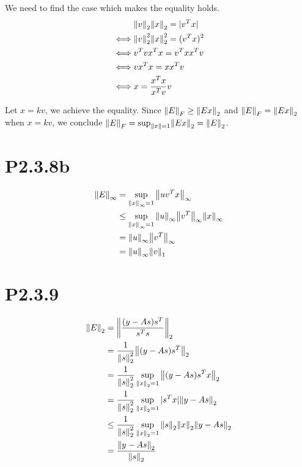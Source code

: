 \documentclass{article}
\begin{document}
We need to find the case which makes the equality holds.
\begin{align*}
         & \norm{v}_2\norm{x}_2 = |v^Tx|       \\
    \iff & \norm{v}_2^2\norm{x}_2^2 = (v^Tx)^2 \\
    \iff & v^Tvx^Tx = v^Txx^Tv                 \\
    \iff & vx^Tx = xx^Tv                       \\
    \iff & x = \frac{x^Tx}{x^Tv}v
\end{align*}

Let $x=kv$, we achieve the equality. Since $\norm{E}_F \ge \norm{Ex}_2$ and $\norm{E}_F = \norm{Ex}_2$ when $x=kv$,
we conclude ${\norm{E}_F = \sup_{\norm{x}=1}} \norm{Ex}_2 = \norm{E}_2$.

\section*{P2.3.8b}
\begin{align*}
    \norm{E}_\infty
     & = \sup_{\norm{x}_\infty=1} \norm{uv^Tx}_\infty                                 \\
     & \le \sup_{\norm{x}_\infty=1} \norm{u}_\infty \norm{v^T}_\infty \norm{x}_\infty \\
     & =\norm{u}_\infty \norm{v^T}_\infty                                             \\
     & =\norm{u}_\infty \norm{v}_1
\end{align*}

\section*{P2.3.9}

\begin{align*}
    \norm{E}_2
     & = \norm{\frac{(y-As)s^T}{s^Ts}}_2              \\
     & = \frac{1}{\norm{s}_2^2}\norm{(y-As)s^T}_2     \\
     & = \frac{1}{\norm{s}_2^2} \sup_{\norm{x}_2=1}
    \norm{(y-As)s^Tx}_2                               \\
     & = \frac{1}{\norm{s}_2^2} \sup_{\norm{x}_2=1}
    |s^Tx| \norm{y-As}_2                              \\
     & \le \frac{1}{\norm{s}_2^2} \sup_{\norm{x}_2=1}
    \norm{s}_2\norm{x}_2 \norm{y-As}_2                \\
     & = \frac{\norm{y-As}_2}{\norm{s}_2}
\end{align*}
\end{document}
